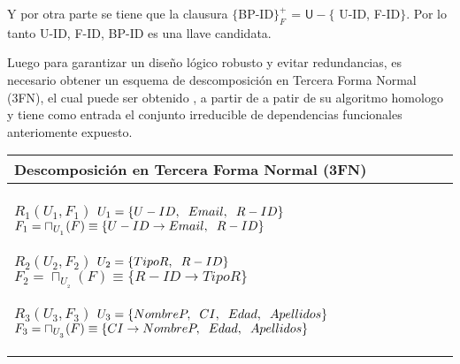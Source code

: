 \documentclass{report}
\begin{document}
    Y por otra parte se tiene que la clausura $\{$BP-ID$\}_{F}^{+}$ = $\mathsf{U} - \{$ U-ID, F-ID$\}$. Por lo tanto U-ID, F-ID, BP-ID es una llave candidata. \newline

    Luego para garantizar un diseño lógico robusto y evitar redundancias, es necesario obtener un esquema de descomposición en Tercera Forma Normal (3FN),
    el cual puede ser obtenido , a partir de a patir de su algoritmo homologo y tiene como entrada el conjunto irreducible de dependencias funcionales anteriomente expuesto. \newline
      
    \begin{tabularx}{\textwidth}{|X|}
        \toprule
        \hfil \textbf{Descomposición en Tercera Forma Normal (3FN)} \\
        \midrule
        $ R_{1} ( U_{1} , F_{1} ) $ \newline 
        $ U_{1} = \{{U-ID, \hspace{0.2cm}  Email, \hspace{0.2cm}  R-ID}\} $ \newline 
        $ F_{1} = \sqcap_{U_{_{1}}}(F) \equiv \{U-ID \rightarrow Email, \hspace{0.2cm} R-ID \} $\newline 
        
        $ R_{2} ( U_{2} , F_{2} ) $ \newline 
        $ U_{2} = \{{TipoR, \hspace{0.2cm}  R-ID}\} $ \newline 
        $ F_{2} = \sqcap_{U_{_{2}}}(F) \equiv \{R-ID \rightarrow TipoR \} $\newline 
        
        $ R_{3} ( U_{3} , F_{3} ) $ \newline 
        $ U_{3} = \{{NombreP, \hspace{0.2cm}  CI, \hspace{0.2cm}  Edad, \hspace{0.2cm}  Apellidos}\} $ \newline 
        $ F_{3} = \sqcap_{U_{_{3}}}(F) \equiv \{CI \rightarrow NombreP, \hspace{0.2cm} Edad, \hspace{0.2cm} Apellidos \} $\newline 
        

\end{tabularx}
\end{document}
